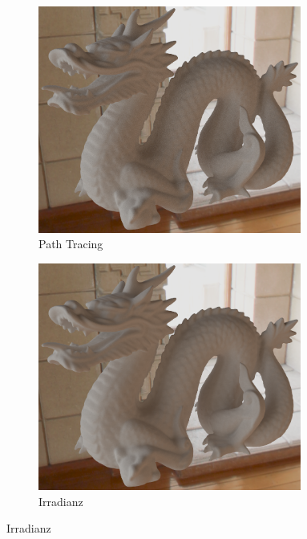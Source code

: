 		\begin{figure}[h]
			\begin{subfigure}[t]{0.33\textwidth}
				\center
				\includegraphics[width=0.95\textwidth]{pic/irr_est-ra-dragon2-ref.png}
				\caption{Path Tracing}
				\label{subfig:irr-est-ra-dragon2-ref}
			\end{subfigure}
			\begin{subfigure}[t]{0.33\textwidth}
				\center
				\includegraphics[width=0.95\textwidth]{pic/irr_est-ra-dragon2-irr.png}
				\caption{Irradianz}
				\label{subfig:irr-est-ra-dragon2-irr}

\end{subfigure}
\end{figure}
